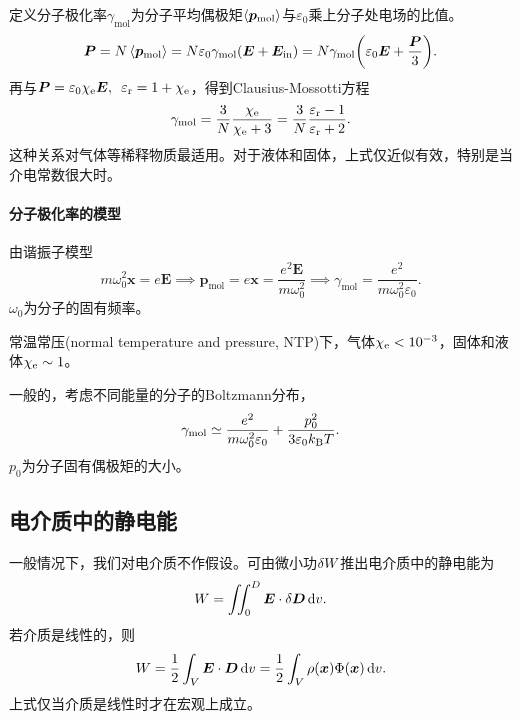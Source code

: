 定义分子极化率$\gamma_\text{mol}$为分子平均偶极矩$\left\langle \bm p_\text{mol}\right\rangle$与$\varepsilon_0$乘上分子处电场的比值。
\[
    \bm P=N\left\langle \bm p_\text{mol}\right\rangle=N\varepsilon_0\gamma_\text{mol}(\bm E+\bm E_\text{in})=N\gamma_\text{mol}\biggl(\varepsilon_0\bm E+\frac{\bm P}3\biggr).
\]
再与$\bm P=\varepsilon_0\chi_\mathrm e\bm E,\enspace\varepsilon_\text r=1+\chi_\mathrm e$，得到Clausius-Mossotti方程
\begin{equation}
    \gamma_\text{mol}=\frac3N\frac{\chi_\mathrm e}{\chi_\mathrm e+3}=\frac3N\frac{\varepsilon_\text r-1}{\varepsilon_\text r+2}.
\end{equation}
这种关系对气体等稀释物质最适用。对于液体和固体，上式仅近似有效，特别是当介电常数很大时。
\paragraph{分子极化率的模型}
由谐振子模型
\[
    m\omega_0^2\bm x=e\bm E\implies\bm p_\text{mol}=e\bm x=\frac{e^2\bm E}{m\omega_0^2}\implies\gamma_\text{mol}=\frac{e^2}{m\omega_0^2\varepsilon_0}.
\]
$\omega_0$为分子的固有频率。

常温常压(normal temperature and pressure, NTP)下，气体$\chi_\mathrm e<10^{-3}$，固体和液体$\chi_\mathrm e\sim 1$。

一般的，考虑不同能量的分子的Boltzmann分布，
\[
    \gamma_\text{mol}\simeq\frac{e^2}{m\omega_0^2\varepsilon_0}+\frac{p_0^2}{3\varepsilon_0k_{\mathrm B} T}.
\]
$p_0$为分子固有偶极矩的大小。

\subsection{电介质中的静电能}
\label{ssec:electrostatic energy in dielectric media}

一般情况下，我们对电介质不作假设。可由微小功$\mathop{}\!\delta W$推出电介质中的静电能为
\[
    W=\iint_0^D\bm E\cdot\mathop{}\!\delta\bm D\mathop{}\!\mathrm{d} v.
\]
若介质是线性的，则
\begin{equation}
    W=\frac12\int_V\bm E\cdot\bm D\mathop{}\!\mathrm{d} v=\frac12\int_V\rho(\bm x)\Phi(\bm x)\mathop{}\!\mathrm{d} v.
\end{equation}
上式仅当介质是线性时才在宏观上成立。
